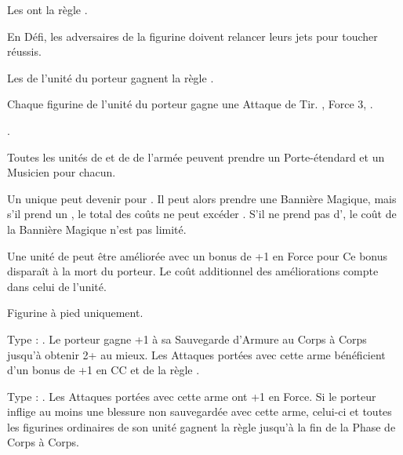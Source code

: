 \begin{multicols}{2}
Les \aspectsofnature{} ont la règle \oneperarmy{}.

\startpricelistNSP

 En Défi, les adversaires de la figurine doivent relancer leurs jets pour toucher réussis.

 Les \dryads{} de l'unité du porteur gagnent la règle \hatred{}.

 Chaque figurine de l'unité du porteur gagne une Attaque de Tir. , Force 3, .

 .

Toutes les unités de \dryads{} et de \thicketbeasts{} de l'armée peuvent prendre un Porte-étendard et un Musicien pour  chacun.

Un unique \thicketshepherd{} peut devenir \bsb{} pour . Il peut alors prendre une Bannière Magique, mais s'il prend un \aspectofnature{}, le total des coûts ne peut excéder . S'il ne prend pas d'\aspectofnature{}, le coût de la Bannière Magique n'est pas limité.

 Une unité de \thicketbeasts{} peut être améliorée avec un bonus de +1 en Force pour \permodel{} Ce bonus disparaît à la mort du porteur. Le coût additionnel des améliorations compte dans celui de l'unité.

\endpricelistNSP
\closearmynewsection

\vspace*{\fill}
\end{multicols}







\startarmymagicalitems

\armymagicalweapons

\startpricelist

Figurine à pied uniquement.

Type : \gw{}. Le porteur gagne +1 à sa Sauvegarde d'Armure au Corps à Corps jusqu'à obtenir 2+ au mieux. Les Attaques portées avec cette arme bénéficient d'un bonus de +1 en CC et de la règle .

Type : \spear{}. Les Attaques portées avec cette arme ont +1 en Force. Si le porteur inflige au moins une blessure non sauvegardée avec cette arme, celui-ci et toutes les figurines ordinaires de son unité gagnent la règle \distracting{} jusqu'à la fin de la Phase de Corps à Corps.

